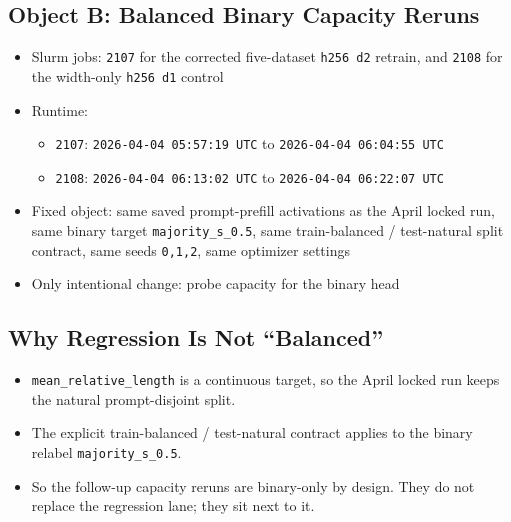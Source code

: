 \documentclass[11pt]{article}
\begin{document}
\subsection*{Object B: Balanced Binary Capacity Reruns}
\begin{itemize}[leftmargin=1.5em]
\item Slurm jobs: \texttt{2107} for the corrected five-dataset \texttt{h256 d2} retrain, and \texttt{2108} for the width-only \texttt{h256 d1} control
\item Runtime:
  \begin{itemize}[leftmargin=1.5em]
  \item \texttt{2107}: \texttt{2026-04-04 05:57:19 UTC} to \texttt{2026-04-04 06:04:55 UTC}
  \item \texttt{2108}: \texttt{2026-04-04 06:13:02 UTC} to \texttt{2026-04-04 06:22:07 UTC}
  \end{itemize}
\item Fixed object: same saved prompt-prefill activations as the April locked run, same binary target \texttt{majority\_s\_0.5}, same train-balanced / test-natural split contract, same seeds \texttt{0,1,2}, same optimizer settings
\item Only intentional change: probe capacity for the binary head
\end{itemize}

\subsection*{Why Regression Is Not ``Balanced''}
\begin{itemize}[leftmargin=1.5em]
\item \texttt{mean\_relative\_length} is a continuous target, so the April locked run keeps the natural prompt-disjoint split.
\item The explicit train-balanced / test-natural contract applies to the binary relabel \texttt{majority\_s\_0.5}.
\item So the follow-up capacity reruns are binary-only by design. They do not replace the regression lane; they sit next to it.
\end{itemize}
\end{document}
